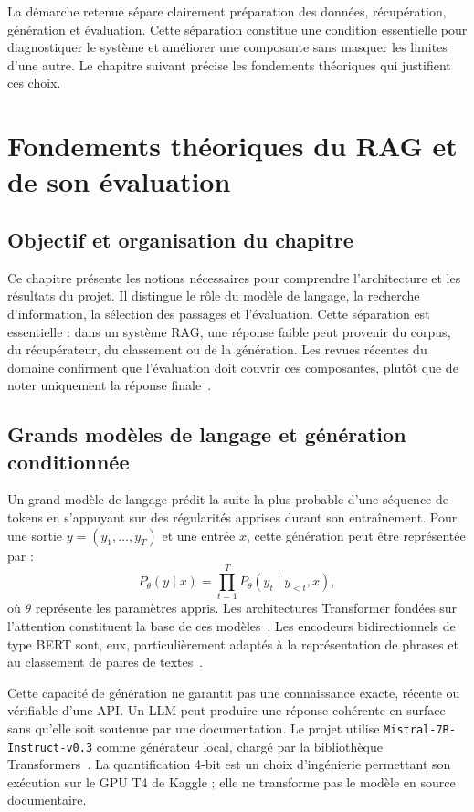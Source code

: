 \documentclass[12pt,a4paper,oneside]{report}
\begin{document}
La démarche retenue sépare clairement préparation des données, récupération,
génération et évaluation. Cette séparation constitue une condition essentielle
pour diagnostiquer le système et améliorer une composante sans masquer les
limites d'une autre. Le chapitre suivant précise les fondements théoriques qui
justifient ces choix.

\chapter{Fondements théoriques du RAG et de son évaluation}
\label{chap:theorie}

\section{Objectif et organisation du chapitre}

Ce chapitre présente les notions nécessaires pour comprendre l'architecture et
les résultats du projet. Il distingue le rôle du modèle de langage, la recherche
d'information, la sélection des passages et l'évaluation. Cette séparation est
essentielle : dans un système RAG, une réponse faible peut provenir du corpus,
du récupérateur, du classement ou de la génération. Les revues récentes du
domaine confirment que l'évaluation doit couvrir ces composantes, plutôt que de
noter uniquement la réponse finale~\cite{gao2023survey,yu2024eval}.

\section{Grands modèles de langage et génération conditionnée}

Un grand modèle de langage prédit la suite la plus probable d'une séquence de
tokens en s'appuyant sur des régularités apprises durant son entraînement. Pour
une sortie $y=(y_1,\ldots,y_T)$ et une entrée $x$, cette génération peut être
représentée par :
\[
P_\theta(y\mid x)=\prod_{t=1}^{T}P_\theta(y_t\mid y_{<t},x),
\]
où $\theta$ représente les paramètres appris. Les architectures Transformer
fondées sur l'attention constituent la base de ces modèles~\cite{vaswani2017attention}.
Les encodeurs bidirectionnels de type BERT sont, eux, particulièrement adaptés à
la représentation de phrases et au classement de paires de textes~\cite{devlin2018bert}.

Cette capacité de génération ne garantit pas une connaissance exacte, récente ou
vérifiable d'une API. Un LLM peut produire une réponse cohérente en surface sans
qu'elle soit soutenue par une documentation. Le projet utilise
\texttt{Mistral-7B-Instruct-v0.3} comme générateur local, chargé par la
bibliothèque Transformers~\cite{jiang2023mistral,wolf2019transformers}. La
quantification 4-bit est un choix d'ingénierie permettant son exécution sur le
GPU T4 de Kaggle ; elle ne transforme pas le modèle en source documentaire.
\end{document}
